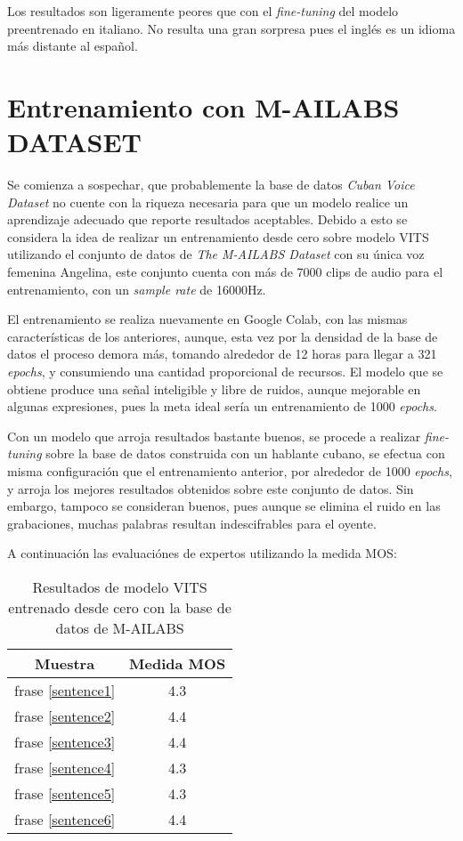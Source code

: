 Los resultados son ligeramente peores que con el \textit{fine-tuning} del modelo preentrenado en italiano. No resulta una gran sorpresa pues el inglés es un idioma más distante al español.

\section{Entrenamiento con M-AILABS DATASET} \label{vits_angel}
Se comienza a sospechar, que probablemente la base de datos \textit{Cuban Voice Dataset} no cuente con la riqueza necesaria para que un modelo realice un aprendizaje adecuado que reporte resultados aceptables. Debido a esto se considera la idea de realizar un entrenamiento desde cero sobre modelo VITS utilizando el conjunto de datos de \textit{The M-AILABS Dataset} con su única voz femenina Angelina, este conjunto cuenta con más de 7000 clips de audio para el entrenamiento, con un \textit{sample rate} de 16000Hz.

El entrenamiento se realiza nuevamente en Google Colab, con las mismas características de los anteriores, aunque, esta vez por la densidad de la base de datos el proceso demora más, tomando alrededor de 12 horas para llegar a 321 \textit{epochs}, y consumiendo una cantidad proporcional de recursos. El modelo que se obtiene produce una señal inteligible y libre de ruidos, aunque mejorable en algunas expresiones, pues la meta ideal sería un entrenamiento de 1000 \textit{epochs}.

Con un modelo que arroja resultados bastante buenos, se procede a realizar \textit{fine-tuning} sobre la base de datos construida con un hablante cubano, se efectua con misma configuración que el entrenamiento anterior, por alrededor de 1000 \textit{epochs}, y arroja los mejores resultados obtenidos sobre este conjunto de datos. Sin embargo, tampoco se consideran buenos, pues aunque se elimina el ruido en las grabaciones, muchas palabras resultan indescifrables para el oyente.

A continuación las evaluaciónes de expertos utilizando la medida MOS:


\begin{table}[H]
	\begin{center} 
\begin{tabular}{ |c|c| } 
	\hline
	Muestra & Medida MOS \\
	\hline
	frase \ref{sentence1} & 4.3 \\
	frase \ref{sentence2} & 4.4 \\
	frase \ref{sentence3} & 4.4 \\
	frase \ref{sentence4} & 4.3 \\
	frase \ref{sentence5} & 4.3 \\
	frase \ref{sentence6} & 4.4 \\
	\hline
\end{tabular}
\caption{Resultados de modelo VITS entrenado desde cero con la base de datos de M-AILABS} 
\end{center}
\end{table}
	
